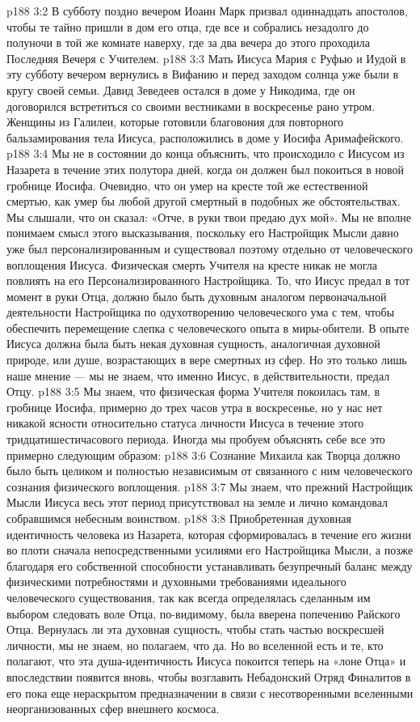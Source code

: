 \vs p188 3:2 В субботу поздно вечером Иоанн Марк призвал одиннадцать апостолов, чтобы те тайно пришли в дом его отца, где все и собрались незадолго до полуночи в той же комнате наверху, где за два вечера до этого проходила Последняя Вечеря с Учителем.
\vs p188 3:3 Мать Иисуса Мария с Руфью и Иудой в эту субботу вечером вернулись в Вифанию и перед заходом солнца уже были в кругу своей семьи. Давид Зеведеев остался в доме у Никодима, где он договорился встретиться со своими вестниками в воскресенье рано утром. Женщины из Галилеи, которые готовили благовония для повторного бальзамирования тела Иисуса, расположились в доме у Иосифа Аримафейского.
\vs p188 3:4 \pc Мы не в состоянии до конца объяснить, что происходило с Иисусом из Назарета в течение этих полутора дней, когда он должен был покоиться в новой гробнице Иосифа. Очевидно, что он умер на кресте той же естественной смертью, как умер бы любой другой смертный в подобных же обстоятельствах. Мы слышали, что он сказал: «Отче, в руки твои предаю дух мой». Мы не вполне понимаем смысл этого высказывания, поскольку его Настройщик Мысли давно уже был персонализированным и существовал поэтому отдельно от человеческого воплощения Иисуса. Физическая смерть Учителя на кресте никак не могла повлиять на его Персонализированного Настройщика. То, что Иисус предал в тот момент в руки Отца, должно было быть духовным аналогом первоначальной деятельности Настройщика по одухотворению человеческого ума с тем, чтобы обеспечить перемещение слепка с человеческого опыта в миры\hyp{}обители. В опыте Иисуса должна была быть некая духовная сущность, аналогичная духовной природе, или душе, возрастающих в вере смертных из сфер. Но это только лишь наше мнение --- мы не знаем, что именно Иисус, в действительности, предал Отцу.
\vs p188 3:5 Мы знаем, что физическая форма Учителя покоилась там, в гробнице Иосифа, примерно до трех часов утра в воскресенье, но у нас нет никакой ясности относительно статуса личности Иисуса в течение этого тридцатишестичасового периода. Иногда мы пробуем объяснять себе все это примерно следующим образом:
\vs p188 3:6 \bibnobreakspace Сознание Михаила как Творца должно было быть целиком и полностью независимым от связанного с ним человеческого сознания физического воплощения.
\vs p188 3:7 \bibnobreakspace Мы знаем, что прежний Настройщик Мысли Иисуса весь этот период присутствовал на земле и лично командовал собравшимся небесным воинством.
\vs p188 3:8 \bibnobreakspace Приобретенная духовная идентичность человека из Назарета, которая сформировалась в течение его жизни во плоти сначала непосредственными усилиями его Настройщика Мысли, а позже благодаря его собственной способности устанавливать безупречный баланс между физическими потребностями и духовными требованиями идеального человеческого существования, так как всегда определялась сделанным им выбором следовать воле Отца, по\hyp{}видимому, была вверена попечению Райского Отца. Вернулась ли эта духовная сущность, чтобы стать частью воскресшей личности, мы не знаем, но полагаем, что да. Но во вселенной есть и те, кто полагают, что эта душа\hyp{}идентичность Иисуса покоится теперь на «лоне Отца» и впоследствии появится вновь, чтобы возглавить Небадонский Отряд Финалитов в его пока еще нераскрытом предназначении в связи с несотворенными вселенными неорганизованных сфер внешнего космоса.
